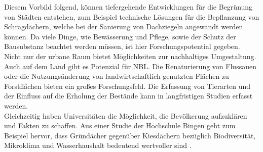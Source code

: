   Diesem Vorbild folgend, können tiefergehende Entwicklungen für die Begrünung von Städten entstehen, zum Beispiel technische Lösungen für die Bepflanzung von Schrägdächern, welche bei der Sanierung von Dachziegeln angewandt werden können. Da viele Dinge, wie Bewässerung und Pflege, sowie der Schutz der Bausubstanz beachtet werden müssen, ist hier Forschungspotential gegeben.\\
  Nicht nur der urbane Raum bietet Möglichkeiten zur nachhaltiges Umgestaltung. Auch auf dem Land gibt es Potenzial für NBL. Die Renaturierung von Flussauen oder die Nutzungsänderung von landwirtschaftlich genutzten Flächen zu Forstflächen bieten ein großes Forschungsfeld. Die Erfassung von Tierarten und der Einfluss auf die Erholung der Bestände kann in langfristigen Studien erfasst werden.\\
  Gleichzeitig haben Universitäten die Möglichkeit, die Bevölkerung aufzuklären und Fakten zu schaffen. Aus einer Studie der Hochschule Bingen geht zum Beispiel hervor, dass Gründächer gegenüber Kiesdächern bezüglich Biodiversität, Mikroklima und Wasserhaushalt bedeutend wertvoller sind \cite{hietel_extensive_2016}.
